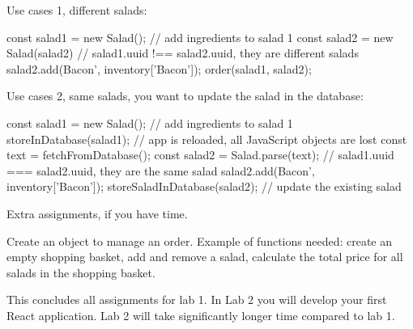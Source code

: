 \documentclass[fleqn, article, a4paper]{memoir}
\begin{document}
\begin{Assignments}
\noindent Use cases 1, different salads:
\begin{Code}
const salad1 = new Salad();
// add ingredients to salad 1
const salad2 = new Salad(salad2)
// salad1.uuid !== salad2.uuid, they are different salads
salad2.add(Bacon', inventory['Bacon']);
order(salad1, salad2);
\end{Code}
Use cases 2, same salads, you want to update the salad in the database:
\begin{Code}
const salad1 = new Salad(); // add ingredients to salad 1
storeInDatabase(salad1);
// app is reloaded, all JavaScript objects are lost
const text = fetchFromDatabase();
const salad2 = Salad.parse(text);
// salad1.uuid === salad2.uuid, they are the same salad
salad2.add(Bacon', inventory['Bacon']);
storeSaladInDatabase(salad2); // update the existing salad
\end{Code}
\end{Assignments}

\noindent Extra assignments, if you have time.
\begin{Assignments}

\item Create an object to manage an order. Example of functions needed: create an empty shopping basket, add and remove a salad, calculate the total price for all salads in the shopping basket.

\end{Assignments}

\noindent This concludes all assignments for lab 1. In Lab 2 you will develop your first React application. Lab 2 will take significantly longer time compared to lab 1.


\end{document}
